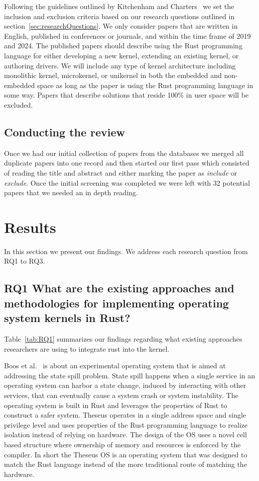 \documentclass[sigconf]{acmart}
\begin{document}
Following the guidelines outlined by Kitchenham and Charters~\cite{Stuart2007-cc} we set the
inclusion and exclusion criteria based on our research questions outlined in
section~\ref{sec:researchQuestions}. We only consider papers that are written in English, published
in conferences or journals, and within the time frame of 2019 and 2024. The published papers should
describe using the Rust programming language for either developing a new kernel, extending an
existing kernel, or authoring drivers. We will include any type of kernel architecture including
monolithic kernel, microkernel, or unikernel in both the embedded and non-embedded space as long as
the paper is using the Rust programming language in some way. Papers that describe solutions that
reside 100\% in user space will be excluded.

\subsection{Conducting the review}

Once we had our initial collection of papers from the databases we merged all duplicate
papers into one record and then started our first pass which consisted of reading the title and
abstract and either marking the paper as \textit{include} or \textit{exclude}.
Once  the initial screening was completed we were left with 32 potential papers that
we needed an in depth reading.

\section{Results}

In this section we present our findings. We address each research question from RQ1 to RQ3.

\subsection{RQ1 What are the existing approaches and methodologies for implementing
      operating system kernels in Rust?}

Table~\ref{tab:RQ1} summarizes our findings regarding what existing approaches researchers are using to integrate rust into the kernel.

Boos et al.~\cite{Boos2020-zh} is about an experimental operating system that is aimed at addressing
the state spill problem. State spill happens when a single service in an operating system can harbor
a state change, induced by interacting with other services, that can eventually cause a system crash
or system instability. The operating system is built in Rust and leverages the properties of Rust to
construct a safer system. Theseus operates in a single address space and single privilege level and
uses properties of the Rust programming language to realize isolation instead of relying on
hardware. The design of the OS uses a novel cell based structure where ownership of memory and
resources is enforced by the compiler. In short the Theseus OS is an operating system that was
designed to match the Rust language instead of the more traditional route of matching the hardware.
\end{document}
